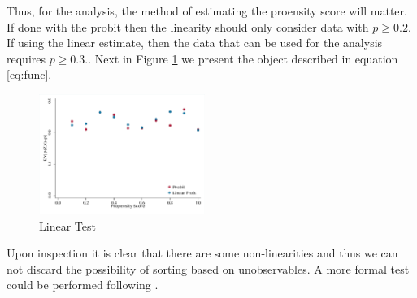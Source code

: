 \FloatBarrier
Thus, for the analysis, the method of estimating the proensity score will matter. If done with the probit then the linearity should only consider data with $p\geq0.2$. If using the linear estimate, then the data that can be used for the analysis requires $p\geq 0.3.$. Next in Figure \ref{fig:linTest} we present the object described in equation \eqref{eq:func}. 
\begin{figure}[htb]
    \centering
    \caption{\sc Linear Test}
    \label{fig:linTest}
    \includegraphics[width=0.48\textwidth]{Figures/Linear_Test.pdf}
\end{figure}
Upon inspection it is clear that there are some non-linearities and thus we can not discard the possibility of sorting based on unobservables. A more formal test could be performed following \citet{Chen1999}. 